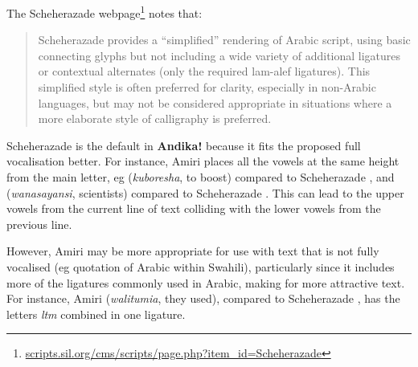 The Scheherazade webpage\footnote{\url{scripts.sil.org/cms/scripts/page.php?item_id=Scheherazade}} notes that:
\begin{quotation}
Scheherazade provides a “simplified” rendering of Arabic script, using basic connecting glyphs but not including a wide variety of additional ligatures or contextual alternates (only the required lam-alef ligatures). This simplified style is often preferred for clarity, especially in non-Arabic languages, but may not be considered appropriate in situations where a more elaborate style of calligraphy is preferred.
\end{quotation}

Scheherazade is the default in \textbf{Andika!} because it fits the proposed full vocalisation better.  For instance, Amiri places all the vowels at the same height from the main letter, eg  (\textit{kuboresha}, to boost) compared to Scheherazade , and  (\textit{wanasayansi}, scientists) compared to Scheherazade . This can lead to the upper vowels from the current line of text colliding with the lower vowels from the previous line.

However, Amiri may be more appropriate for use with text that is not fully vocalised (eg quotation of Arabic within Swahili), particularly since it includes more of the ligatures commonly used in Arabic, making for more attractive text. For instance, Amiri  (\textit{walitumia}, they used), compared to Scheherazade , has the letters \textit{ltm} combined in one ligature.
